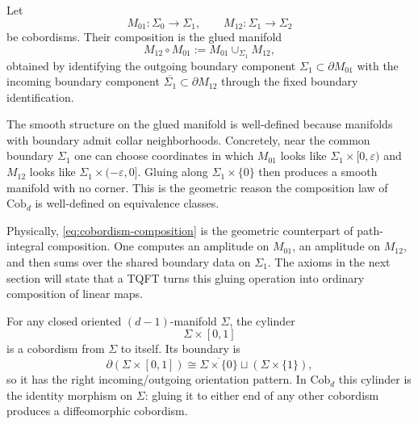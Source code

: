 \begin{definition}\label{def:cobordism-composition}
Let
\begin{equation*}
M_{01} : \Sigma_0 \to \Sigma_1,
\qquad
M_{12} : \Sigma_1 \to \Sigma_2
\end{equation*}
be cobordisms. Their composition is the glued manifold
\begin{equation}\label{eq:cobordism-composition}
M_{12} \circ M_{01} := M_{01} \cup_{\Sigma_1} M_{12},
\end{equation}
obtained by identifying the outgoing boundary component $\Sigma_1 \subset \partial M_{01}$ with the incoming boundary component $\overline{\Sigma_1} \subset \partial M_{12}$ through the fixed boundary identification.
\end{definition}

\begin{remark}\label{rem:collar-neighborhood}
The smooth structure on the glued manifold is well-defined because manifolds with boundary admit collar neighborhoods. Concretely, near the common boundary $\Sigma_1$ one can choose coordinates in which $M_{01}$ looks like $\Sigma_1 \times [0,\varepsilon)$ and $M_{12}$ looks like $\Sigma_1 \times (-\varepsilon,0]$. Gluing along $\Sigma_1 \times \{0\}$ then produces a smooth manifold with no corner. This is the geometric reason the composition law of $\mathrm{Cob}_d$ is well-defined on equivalence classes.
\end{remark}

\noindent Physically, \eqref{eq:cobordism-composition} is the geometric counterpart of path-integral composition. One computes an amplitude on $M_{01}$, an amplitude on $M_{12}$, and then sums over the shared boundary data on $\Sigma_1$. The axioms in the next section will state that a TQFT turns this gluing operation into ordinary composition of linear maps.

\begin{example}\label{ex:cylinder-cobordism}
For any closed oriented $(d-1)$-manifold $\Sigma$, the cylinder
\begin{equation}\label{eq:cylinder}
\Sigma \times [0,1]
\end{equation}
is a cobordism from $\Sigma$ to itself. Its boundary is
\begin{equation*}
\partial(\Sigma \times [0,1]) \cong \overline{\Sigma \times \{0\}} \sqcup (\Sigma \times \{1\}),
\end{equation*}
so it has the right incoming/outgoing orientation pattern. In $\mathrm{Cob}_d$ this cylinder is the identity morphism on $\Sigma$: gluing it to either end of any other cobordism produces a diffeomorphic cobordism.
\end{example}

